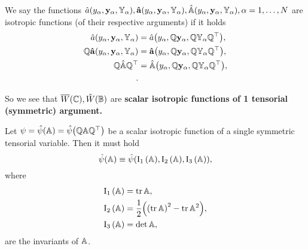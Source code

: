 \documentclass[11pt]{scrartcl} %
\begin{document}
\begin{definition}
	We say the functions $\hat{a}\qty(y_{\alpha}, \vb{y}_{\alpha}, \mathbb{Y}_{\alpha}), \vb{\hat{a}}\qty(y_{\alpha}, \vb{y}_{\alpha}, \mathbb{Y}_{\alpha}), \hat{\mathbb{A}}\qty(y_{\alpha},\vb{y}_{\alpha},\mathbb{Y}_{\alpha}), \alpha = 1, \dots, N$ are isotropic functions (of their respective arguments) if it holds
	\begin{align*}
		\hat{a}\qty(y_{\alpha}, \vb{y}_{\alpha}, \mathbb{Y}_{\alpha}) &= \hat{a}\qty(y_{\alpha}, \mathbb{Q}\vb{y}_{\alpha}, \mathbb{Q} \mathbb{Y}_{\alpha} \mathbb{Q}^\top), \\
		\mathbb{Q} \vb{\hat{a}}\qty(y_{\alpha}, \vb{y}_{\alpha}, \mathbb{Y}_{\alpha}) &= \vb{\hat{a}}\qty(y_{\alpha}, \mathbb{Q}\vb{y}_{\alpha}, \mathbb{Q}\mathbb{Y}_{\alpha}\mathbb{Q}^\top), \\
		\mathbb{Q}\hat{\mathbb{A}} \mathbb{Q}^\top &= \hat{\mathbb{A}}\qty(y_{\alpha}, \mathbb{Q}\vb{y}_{\alpha}, \mathbb{Q}\mathbb{Y}_{\alpha}\mathbb{Q}^\top), \\.
	\end{align*}
\end{definition}
So we see that $\overline{W}\qty(\mathbb{C}), \tilde{W}\qty(\mathbb{B})$ are \textbf{scalar isotropic functions of 1 tensorial (symmetric) argument.}

\begin{theorem}
	Let $\psi = \hat{\psi}\qty(\mathbb{A}) = \hat{\psi}\qty(\mathbb{Q}\mathbb{A}\mathbb{Q}^\top)$ be a scalar isotropic function of a single symmetric tensorial variable. Then it must hold
	\[
		\hat{\psi}\qty(\mathbb{A}) \equiv \hat{\psi}\qty(\operatorname{I_1}\qty(\mathbb{A}),\operatorname{I_2}\qty(\mathbb{A}),\operatorname{I_3}\qty(\mathbb{A})),
	\]	
where
\begin{align*}
	\operatorname{I_1}\qty(\mathbb{A}) &= \tr \mathbb{A},\\
	\operatorname{I_2}\qty(\mathbb{A}) &= \frac{1}{2}\qty(\qty(\tr \mathbb{A})^{2}-\tr \mathbb{A}^{2}),\\
	\operatorname{I_3}\qty(\mathbb{A}) &= \det \mathbb{A},
\end{align*}
are the invariants of $\mathbb{A}$.
\end{theorem}
\end{document}
